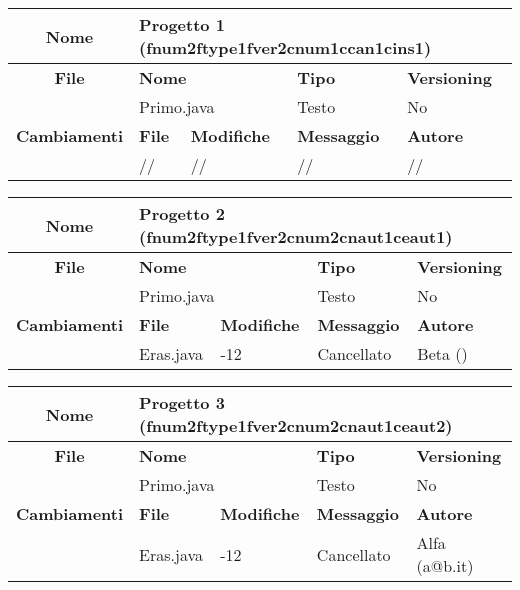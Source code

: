 \begin{table}[ht]
\footnotesize
\begin{tabular}{|c|p{2.5cm}|p{2cm}|p{2.5cm}|p{2.5cm}|}
  \hline
  \textbf{Nome}	& \multicolumn{4}{l|}{Progetto 1 (fnum2ftype1fver2cnum1ccan1cins1)} 									\\
  \hline
  \rowcolor{lightgray}\textbf{File} 		& \multicolumn{2}{l|}{\textbf{Nome}}		& \textbf{Tipo}		& \textbf{Versioning} 		\\
						\cline{2-5}
						& \multicolumn{2}{l|}{Primo.java}		& Testo			& No				\\
  \hline
  \rowcolor{lightgray}\textbf{Cambiamenti}	& \textbf{File}		&\textbf{Modifiche}	& \textbf{Messaggio}	& \textbf{Autore}		\\
						\cline{2-5}
						& //			& //	  		& //			& //				\\
						
  \hline
\end{tabular}
\end{table}

\begin{table}[ht]
\footnotesize
\begin{tabular}{|c|p{2.5cm}|p{2cm}|p{2.5cm}|p{2.5cm}|}
  \hline
  \textbf{Nome}	& \multicolumn{4}{l|}{Progetto 2 (fnum2ftype1fver2cnum2cnaut1ceaut1)} 									\\
  \hline
  \rowcolor{lightgray}\textbf{File} 		& \multicolumn{2}{l|}{\textbf{Nome}}		& \textbf{Tipo}		& \textbf{Versioning} 		\\
						\cline{2-5}
						& \multicolumn{2}{l|}{Primo.java}		& Testo			& No				\\
  \hline
  \rowcolor{lightgray}\textbf{Cambiamenti}	& \textbf{File}		&\textbf{Modifiche}	& \textbf{Messaggio}	& \textbf{Autore}		\\
						\cline{2-5}
						& Eras.java		& -12	  		& Cancellato		& Beta ()			\\
						
  \hline
\end{tabular}
\end{table}

\begin{table}[ht]
\footnotesize
\begin{tabular}{|c|p{2.5cm}|p{2cm}|p{2.5cm}|p{2.5cm}|}
  \hline
  \textbf{Nome}	& \multicolumn{4}{l|}{Progetto 3 (fnum2ftype1fver2cnum2cnaut1ceaut2)} 									\\
  \hline
  \rowcolor{lightgray}\textbf{File} 		& \multicolumn{2}{l|}{\textbf{Nome}}		& \textbf{Tipo}		& \textbf{Versioning} 		\\
						\cline{2-5}
						& \multicolumn{2}{l|}{Primo.java}		& Testo			& No				\\
  \hline
  \rowcolor{lightgray}\textbf{Cambiamenti}	& \textbf{File}		&\textbf{Modifiche}	& \textbf{Messaggio}	& \textbf{Autore}		\\
						\cline{2-5}
						& Eras.java		& -12	  		& Cancellato		& Alfa (a@b.it)			\\
						
  \hline
\end{tabular}
\end{table}

